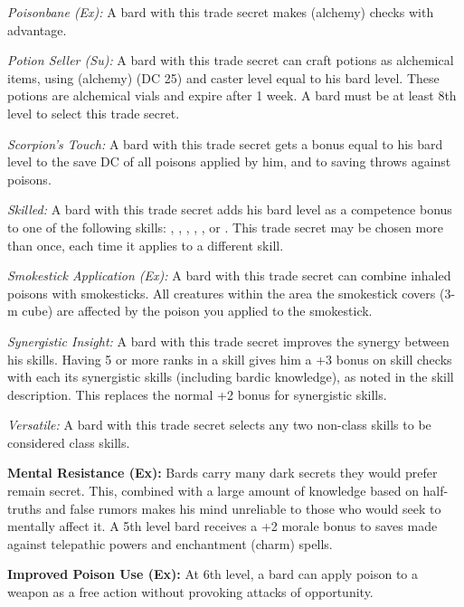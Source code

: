 \textit{Poisonbane (Ex):} A bard with this trade secret makes  (alchemy) checks with advantage.


\textit{Potion Seller (Su):} A bard with this trade secret can craft  potions as alchemical items, using  (alchemy) (DC 25) and caster level equal to his bard level. These potions are alchemical vials and expire after 1 week. A bard must be at least 8th level to select this trade secret.

\textit{Scorpion's Touch:} A bard with this trade secret gets a bonus equal to \onequarter his bard level to the save DC of all poisons applied by him, and to saving throws against poisons.

\textit{Skilled:} A bard with this trade secret adds \onequarter his bard level as a competence bonus to one of the following skills: , , , , ,  or . This trade secret may be chosen more than once, each time it applies to a different skill.

\textit{Smokestick Application (Ex):} A bard with this trade secret can combine inhaled poisons with smokesticks. All creatures within the area the smokestick covers (3-m cube) are affected by the poison you applied to the smokestick.

\textit{Synergistic Insight:} A bard with this trade secret improves the synergy between his skills. Having 5 or more ranks in a skill gives him a +3 bonus on skill checks with each its synergistic skills (including bardic knowledge), as noted in the skill description. This replaces the normal +2 bonus for synergistic skills.

\textit{Versatile:} A bard with this trade secret selects any two non-class skills to be considered class skills.


\textbf{Mental Resistance (Ex):} Bards carry many dark secrets they would prefer remain secret. This, combined with a large amount of knowledge based on half-truths and false rumors makes his mind unreliable to those who would seek to mentally affect it. A 5th level bard receives a +2 morale bonus to saves made against telepathic powers and enchantment (charm) spells.


\textbf{Improved Poison Use (Ex):} At 6th level, a bard can apply poison to a weapon as a free action without provoking attacks of opportunity.



